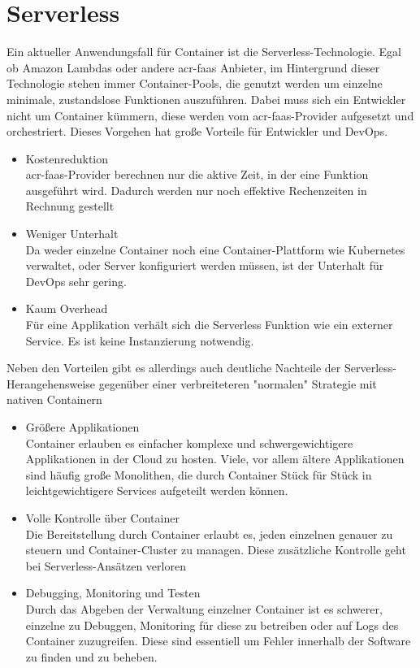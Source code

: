 \section{Serverless}
\label{sec:aktuellesServerless}

Ein aktueller Anwendungsfall für Container ist die Serverless-Technologie. Egal ob Amazon Lambdas oder andere \gls{acr-faas} Anbieter, im Hintergrund dieser Technologie stehen immer Container-Pools, die genutzt werden um einzelne minimale, zustandslose Funktionen auszuführen. Dabei muss sich ein Entwickler nicht um Container kümmern, diese werden vom \gls{acr-faas}-Provider aufgesetzt und orchestriert. Dieses Vorgehen hat große Vorteile für Entwickler und DevOps.

\begin{itemize}
	\item Kostenreduktion \\
	\gls{acr-faas}-Provider berechnen nur die aktive Zeit, in der eine Funktion ausgeführt wird. Dadurch werden nur noch effektive Rechenzeiten in Rechnung gestellt
	\item Weniger Unterhalt \\
	Da weder einzelne Container noch eine Container-Plattform wie Kubernetes verwaltet, oder Server konfiguriert werden müssen, ist der Unterhalt für DevOps sehr gering.
	\item Kaum Overhead \\
	Für eine Applikation verhält sich die Serverless Funktion wie ein externer Service. Es ist keine Instanzierung notwendig.
\end{itemize}

Neben den Vorteilen gibt es allerdings auch deutliche Nachteile der Serverless-Herangehensweise gegenüber einer verbreiteteren "normalen" Strategie mit nativen Containern

\begin{itemize}
	\item Größere Applikationen \\
	Container erlauben es einfacher komplexe und schwergewichtigere Applikationen in der Cloud zu hosten. Viele, vor allem ältere Applikationen sind häufig große Monolithen, die durch Container Stück für Stück in leichtgewichtigere Services aufgeteilt werden können.
	\item Volle Kontrolle über Container \\
	Die Bereitstellung durch Container erlaubt es, jeden einzelnen genauer zu steuern und Container-Cluster zu managen. Diese zusätzliche Kontrolle geht bei Serverless-Ansätzen verloren
	\item Debugging, Monitoring und Testen \\
	Durch das Abgeben der Verwaltung einzelner Container ist es schwerer, einzelne zu Debuggen, Monitoring für diese zu betreiben oder auf Logs des Container zuzugreifen. Diese sind essentiell um Fehler innerhalb der Software zu finden und zu beheben.
\end{itemize}

